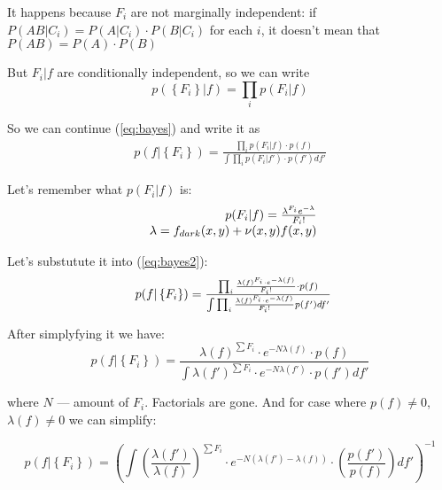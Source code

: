 \documentclass{article}
\begin{document}
It happens because $F_i$ are not marginally independent: if $P(AB|C_i) = P(A|C_i) \cdot P(B|C_i)$ for each $i$, it doesn't mean that $P(AB) = P(A)\cdot P(B)$

But $F_i|f$ are conditionally independent, so we can write
\begin{equation}
    p(\left\{ F_i \right\} | f) = \prod_i p(F_i | f)
\end{equation}

So we can continue (\ref{eq:bayes}) and write it as
\begin{eqnarray}
    p(f | \left\{ F_i \right\}) = \frac{\prod_i p(F_i|f) \cdot p(f)}{\int \prod_i p(F_i|f') \cdot p(f') df'} \label{eq:bayes2}
\end{eqnarray}

Let's remember what $p(F_i | f)$ is:
\begin{equation}
\begin{array}{r@{}l}
    p(F_i | f) = \frac{\lambda^{F_i} e^{-\lambda}} {F_i!} \\
    \lambda = f_{dark}(x,y) + \nu(x,y) f(x,y)
\end{array}
\end{equation}

Let's substutute it into (\ref{eq:bayes2}):
\begin{equation}
\begin{array}{r@{}l}
    p(f | \left\{ F_i \right\}) = \frac{\prod_i \frac{\lambda(f)^{F_i} \cdot e^{-\lambda(f)}}{F_i!} \cdot p(f)}
    {\int \prod_i \frac{\lambda(f)^{F_i} \cdot e^{-\lambda(f)}}{F_i!} p(f') df'}
\end{array}
\end{equation}

After simplyfying it we have:
\begin{equation}
    p(f | \left\{ F_i \right\}) = \frac{\lambda(f)^{\sum F_i} \cdot e^{-N\lambda(f)} \cdot p(f)}
    {\int \lambda(f')^{\sum F_i} \cdot e^{-N\lambda(f')} \cdot p(f') df'}
\end{equation}

where $N$ --- amount of $F_i$. Factorials are gone. And for case where $p(f) \ne 0$, $\lambda(f) \ne 0$ we can simplify:

\begin{equation}
    p(f | \left\{ F_i \right\}) = \left( \int \left( \frac{\lambda(f')}{\lambda(f)} \right)^{\sum F_i} \cdot e^{-N(\lambda(f')-\lambda(f))} \cdot \left( \frac{p(f')}{p(f)} \right) df'\right)^{-1}
\end{equation}
\end{document}
